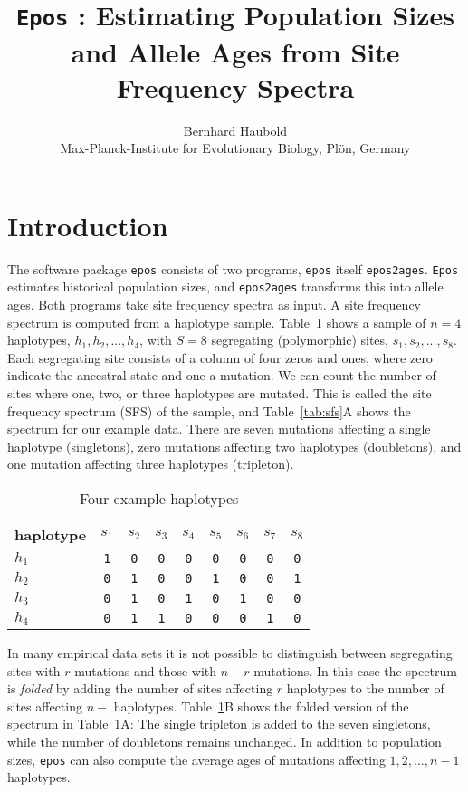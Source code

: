 \documentclass[a4paper]{article}
\newcommand{\ty}{\texttt}
\begin{document}
\title{\ty{Epos} : Estimating Population Sizes and Allele Ages from
  Site Frequency Spectra}
\author{Bernhard Haubold\\\small Max-Planck-Institute for Evolutionary Biology, Pl\"on, Germany}
\maketitle
\section{Introduction} 
The software package \ty{epos} consists of two programs, \ty{epos}
itself \ty{epos2ages}. \ty{Epos} estimates historical population
sizes, and \ty{epos2ages} transforms this into allele ages. Both
programs take site frequency spectra as input. A site frequency
spectrum is computed from a haplotype sample. Table~\ref{tab:hap}
shows a sample of $n=4$ haplotypes, $h_1, h_2,...,h_4$, with $S=8$
segregating (polymorphic) sites, $s_1, s_2,...,s_8$. Each segregating
site consists of a column of four zeros and ones, where zero indicate
the ancestral state and one a mutation. We can count the number of
sites where one, two, or three haplotypes are mutated. This is called
the site frequency spectrum (SFS) of the sample, and
Table~\ref{tab:sfs}A shows the spectrum for our example data. There
are seven mutations affecting a single haplotype (singletons), zero
mutations affecting two haplotypes (doubletons), and one mutation
affecting three haplotypes (tripleton).
\begin{table}
  \caption{Four example haplotypes}\label{tab:hap}
  \begin{center}
    \begin{tabular}{lcccccccc}\hline
haplotype   &   $s_1$ & $s_2$ & $s_3$ & $s_4$ & $s_5$ & $s_6$ & $s_7$ & $s_8$\\\hline
$h_1$ &      \ty{1} & \ty{0} & \ty{0} & \ty{0} & \ty{0} & \ty{0} & \ty{0} & \ty{0}\\
$h_2$ &      \ty{0} & \ty{1} & \ty{0} & \ty{0} & \ty{1} & \ty{0} & \ty{0} & \ty{1}\\
$h_3$ &      \ty{0} & \ty{1} & \ty{0} & \ty{1} & \ty{0} & \ty{1} & \ty{0} & \ty{0}\\
$h_4$ &      \ty{0} & \ty{1} & \ty{1} & \ty{0} & \ty{0} & \ty{0} & \ty{1} &
      \ty{0}\\\hline
      \end{tabular}
  \end{center}
\end{table}
In many empirical data sets it is not possible to distinguish between
segregating sites with $r$ mutations and those with $n-r$
mutations. In this case the spectrum is \textit{folded} by adding the
number of sites affecting $r$ haplotypes to the number of sites
affecting $n-$ haplotypes. Table~\ref{tab:hap}B shows the folded
version of the spectrum in Table~\ref{tab:hap}A: The single tripleton
is added to the seven singletons, while the number of doubletons
remains unchanged.
In addition to population sizes, \ty{epos} can also compute the
average ages of mutations affecting $1, 2,...,n-1$ haplotypes.
\end{document}
